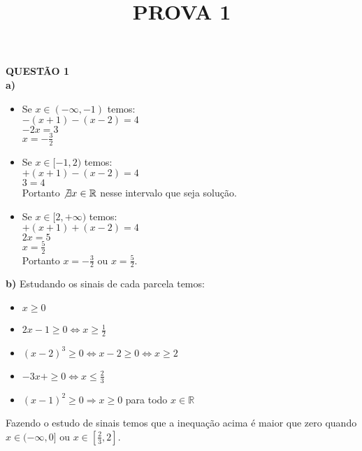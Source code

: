 \documentclass[12pt]{article}
\title{PROVA 1}
\begin{document}
 

\maketitle

\textbf{QUESTÃO 1}\\

\textbf{a)}
\begin{itemize}
\item Se $x\in(-\infty,-1)$ temos:\\
$-(x+1)-(x-2)=4$\\
$-2x=3$\\
$x=- \frac{3}{2}$\\
\item Se $x\in[-1,2)$ temos:\\
$+(x+1)-(x-2)=4$\\
$3=4$\\
Portanto $\not\exists x\in \mathbb{R}$ nesse intervalo que seja solução.\\
\item Se  $x\in[2,+\infty)$ temos:\\
$+(x+1)+(x-2)=4$\\
$2x=5$\\
$x=\frac{5}{2}$\\

Portanto $x=- \frac{3}{2}$ ou $x=\frac{5}{2}$.\\
\end{itemize}

\textbf{b)} 
Estudando os sinais de cada parcela temos:
\begin{itemize}
\item $x\geq0$\\
\item $2x-1\geq0 \Leftrightarrow x\geq\frac{1}{2}$\\
\item $(x-2)^3\geq0 \Leftrightarrow x-2\geq0 \Leftrightarrow x\geq2$\\
\item $-3x+\geq0 \Leftrightarrow x\leq\frac{2}{3}$\\
\item $(x-1)^2\geq0 \Rightarrow x\geq 0$ para todo $x\in\mathbb{R}$\\
\end{itemize}
Fazendo o estudo de sinais temos que a inequação acima é maior que zero quando\\ $x\in(-\infty,0]$ ou $x\in[\frac{2}{3},2]$.\\
\end{document}
